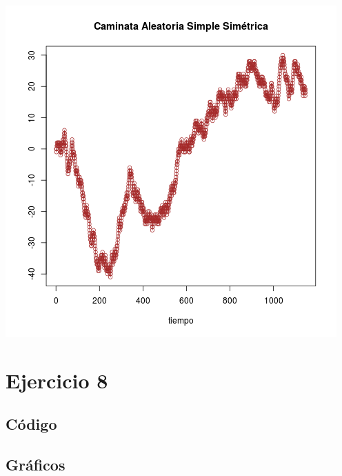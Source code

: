 \documentclass[paper=letter, fontsize=12pt]{scrartcl} %
\numberwithin{equation}{section} %
\numberwithin{figure}{section} %
\numberwithin{table}{section} %
\begin{document}
\begin{center}
  \includegraphics[scale=0.4]{ej7_1.png}
\end{center}

\section{Ejercicio 8}
\subsection{Código}

\subsection{Gráficos}
\end{document}
